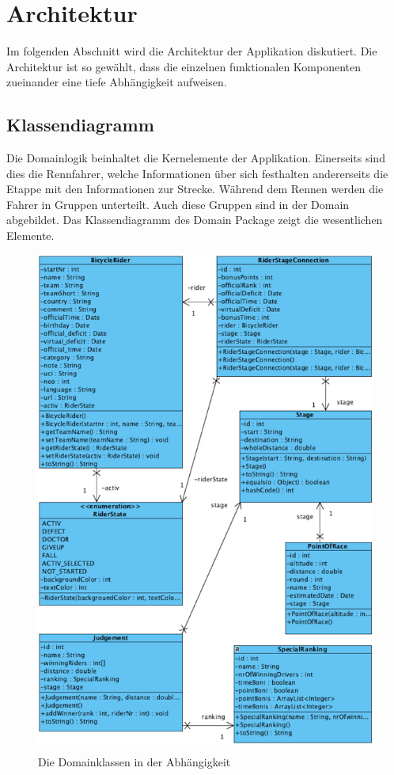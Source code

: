 \chapter{Architektur}
Im folgenden Abschnitt wird die Architektur der Applikation diskutiert. Die Architektur ist so gewählt, dass die einzelnen funktionalen Komponenten zueinander eine tiefe Abhängigkeit aufweisen.

\section{Klassendiagramm}
Die Domainlogik beinhaltet die Kernelemente der Applikation. Einerseits sind dies die Rennfahrer, welche Informationen über sich festhalten andererseits die Etappe mit den Informationen zur Strecke. Während dem Rennen werden die Fahrer in Gruppen unterteilt. Auch diese Gruppen sind in der Domain abgebildet. Das Klassendiagramm des Domain Package zeigt die wesentlichen Elemente.

\begin{figure}[h!]
\caption{Die Domainklassen in der Abhängigkeit}
\label{fig:domain}
\centering
\includegraphics{05bericht/images/domain.png}
\end{figure} 


